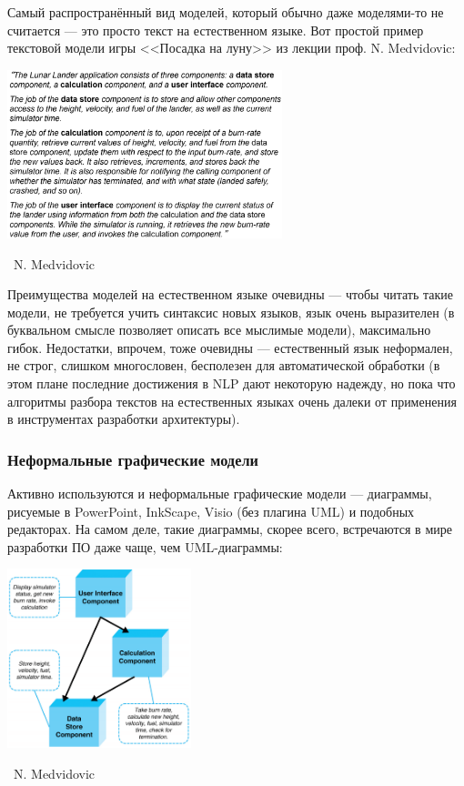 \documentclass[a5paper]{article}
\newcommand{\attribution}[1] {
    \vspace{-5mm}\begin{flushright}\begin{scriptsize}%
    {\textcopyright\, #1}\end{scriptsize}\end{flushright}
}
\begin{document}
Самый распространённый вид моделей, который обычно даже моделями-то не считается --- это просто текст на естественном языке. Вот простой пример текстовой модели игры <<Посадка на луну>> из лекции проф. N. Medvidovic:

\begin{center}
    \includegraphics[width=0.6\textwidth]{naturalLanguage.png}
    \attribution{N. Medvidovic}
\end{center}

Преимущества моделей на естественном языке очевидны --- чтобы читать такие модели, не требуется учить синтаксис новых языков, язык очень выразителен (в буквальном смысле позволяет описать все мыслимые модели), максимально гибок. Недостатки, впрочем, тоже очевидны --- естественный язык неформален, не строг, слишком многословен, бесполезен для автоматической обработки (в этом плане последние достижения в NLP дают некоторую надежду, но пока что алгоритмы разбора текстов на естественных языках очень далеки от применения в инструментах разработки архитектуры).

\subsubsection{Неформальные графические модели}

Активно используются и неформальные графические модели --- диаграммы, рисуемые в PowerPoint, InkScape, Visio (без плагина UML) и подобных редакторах. На самом деле, такие диаграммы, скорее всего, встречаются в мире разработки ПО даже чаще, чем UML-диаграммы:

\begin{center}
    \includegraphics[width=0.4\textwidth]{informalModel.png}
    \attribution{N. Medvidovic}
\end{center}
\end{document}
